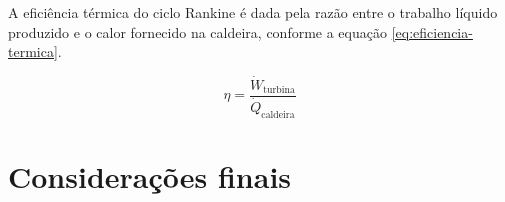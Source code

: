 \documentclass[
	article,			%
	11pt,				%
	oneside,			%
	a4paper,			%
	english,			%
	brazil,				%
	sumario=tradicional
	]{abntex2}
\begin{document}
A eficiência térmica do ciclo Rankine é dada pela razão entre o trabalho líquido produzido e o calor fornecido na caldeira, conforme a equação \ref{eq:eficiencia-termica}.

\begin{equation}
	\eta = \frac{\dot{W}_{\text{turbina}}}{\dot{Q}_{\text{caldeira}}}
	\label{eq:eficiencia-termica}
\end{equation}

%

\section{Considerações finais}

\postextual


\end{document}
